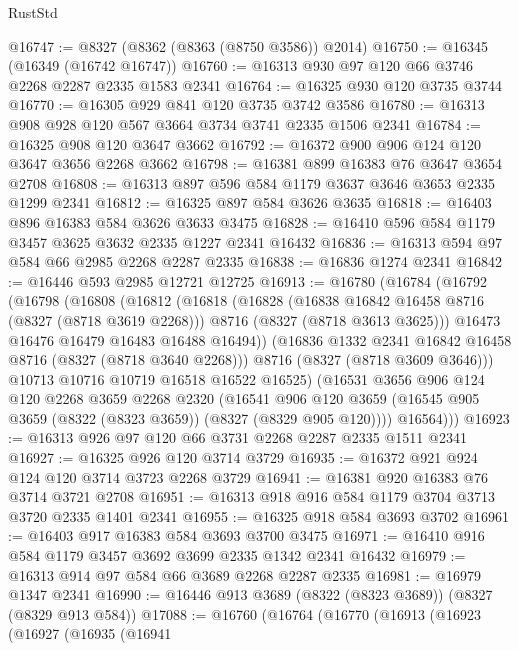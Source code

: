 \begin{lexlean}{RustStd}
\begin{coremodule}
@16747 := @8327 (@8362 (@8363 (@8750 @3586)) @2014)
@16750 := @16345 (@16349 (@16742 @16747))
@16760 := @16313 @930 @97 @120 @66 @3746 @2268 @2287 @2335 @1583 @2341
@16764 := @16325 @930 @120 @3735 @3744
@16770 := @16305 @929 @841 @120 @3735 @3742 @3586
@16780 := @16313 @908 @928 @120 @567 @3664 @3734 @3741 @2335 @1506 @2341
@16784 := @16325 @908 @120 @3647 @3662
@16792 := @16372 @900 @906 @124 @120 @3647 @3656 @2268 @3662
@16798 := @16381 @899 @16383 @76 @3647 @3654 @2708
@16808 := @16313 @897 @596 @584 @1179 @3637 @3646 @3653 @2335 @1299 @2341
@16812 := @16325 @897 @584 @3626 @3635
@16818 := @16403 @896 @16383 @584 @3626 @3633 @3475
@16828 := @16410 @596 @584 @1179 @3457 @3625 @3632 @2335 @1227 @2341 @16432
@16836 := @16313 @594 @97 @584 @66 @2985 @2268 @2287 @2335
@16838 := @16836 @1274 @2341
@16842 := @16446 @593 @2985 @12721 @12725
@16913 := @16780
    (@16784
      (@16792
        (@16798
          (@16808
            (@16812
              (@16818
                (@16828
                  (@16838 @16842 @16458 @8716 (@8327 (@8718 @3619 @2268)))
                  @8716
                  (@8327 (@8718 @3613 @3625)))
                @16473
                @16476
                @16479
                @16483
                @16488
                @16494))
            (@16836 @1332 @2341 @16842 @16458 @8716 (@8327 (@8718 @3640 @2268)))
            @8716
            (@8327 (@8718 @3609 @3646)))
          @10713
          @10716
          @10719
          @16518
          @16522
          @16525)
        (@16531
          @3656
          @906
          @124
          @120
          @2268
          @3659
          @2268
          @2320
          (@16541
            @906
            @120
            @3659
            (@16545 @905 @3659 (@8322 (@8323 @3659)) (@8327 (@8329 @905 @120))))
          @16564)))
@16923 := @16313 @926 @97 @120 @66 @3731 @2268 @2287 @2335 @1511 @2341
@16927 := @16325 @926 @120 @3714 @3729
@16935 := @16372 @921 @924 @124 @120 @3714 @3723 @2268 @3729
@16941 := @16381 @920 @16383 @76 @3714 @3721 @2708
@16951 := @16313 @918 @916 @584 @1179 @3704 @3713 @3720 @2335 @1401 @2341
@16955 := @16325 @918 @584 @3693 @3702
@16961 := @16403 @917 @16383 @584 @3693 @3700 @3475
@16971 := @16410 @916 @584 @1179 @3457 @3692 @3699 @2335 @1342 @2341 @16432
@16979 := @16313 @914 @97 @584 @66 @3689 @2268 @2287 @2335
@16981 := @16979 @1347 @2341
@16990 := @16446 @913 @3689 (@8322 (@8323 @3689)) (@8327 (@8329 @913 @584))
@17088 := @16760
    (@16764
      (@16770
        (@16913
          (@16923
            (@16927
              (@16935
                (@16941

\end{coremodule}
\end{lexlean}
